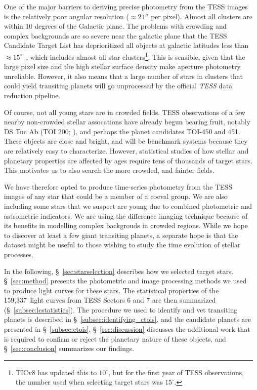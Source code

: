 \documentclass[12pt,twocolumn,tighten]{aastex62}
\newcommand{\numberlcs}{159{,}337\ } %
\begin{document}
One of the major barriers to deriving precise photometry from the
TESS images is the relatively poor angular resolution ($\approx 21''$
per pixel).  Almost all clusters are within 10 degrees of the Galactic
plane. The problems with crowding and complex backgrounds are so
severe near the galactic plane that the TESS Candidate Target List has
deprioritized all objects at galactic latitudes less than $\approx
15^\circ$~\citep{stassun_TIC_2018,stassun_TIC8_2019}, which includes
almost all star clusters\footnote{TICv8 has updated this to $10^\circ$,
but for the first year of TESS observations, the number used when
selecting target stars was $15^\circ$.}.  This is sensible, given that
the large pixel size and the high stellar surface density make
aperture photometry unreliable.  However, it also means that a large
number of stars in clusters that could yield transiting planets will
go unprocessed by the official {\it TESS} data reduction pipeline.

Of course, not all young stars are in crowded fields.  TESS
observations of a few nearby non-crowded stellar assocations have
already begun bearing fruit, notably DS Tuc Ab (TOI 200;
\citealt{benatti_dstuc_2019,newton_dstuc_2019}), and perhaps the
planet candidates TOI-450 and 451.  These objects are close and
bright, and will be benchmark systems because they are relatively easy
to characterize.  However, statistical studies of how stellar and
planetary properties are affected by ages require tens of thousands of
target stars.  This motivates us to also search the more crowded, and
fainter fields.

We have therefore opted to produce time-series photometry from the
TESS images of any star that could be a member of a coeval group.  We
are also including some stars that we suspect are young due to
combined photometric and astrometric indicators.  We are using the
difference imaging technique because of its benefits in modelling
complex backgrouds in crowded regions.  While we hope to discover at
least a few giant transiting planets, a separate hope is that the
dataset might be useful to those wishing to study the time evolution
of stellar processes.

In the following, \S~\ref{sec:starselection} describes how we selected
target stars. \S~\ref{sec:method} presents the photometric and image
processing methods we used to produce light curves for these stars.
The statistical properties of the \numberlcs light curves from TESS Sectors
6 and 7 are then summarized (\S~\ref{subsec:lcstatistics}).  The
procedure we used to identify and vet transiting planets is
described in \S~\ref{subsec:identifying_ctois}, and the candidate
planets are presented in \S~\ref{subsec:ctois}.
\S~\ref{sec:discussion} discusses the additional work that is required
to confirm or reject the planetary nature of these objects, and
\S~\ref{sec:conclusion} summarizes our findings.
\end{document}
